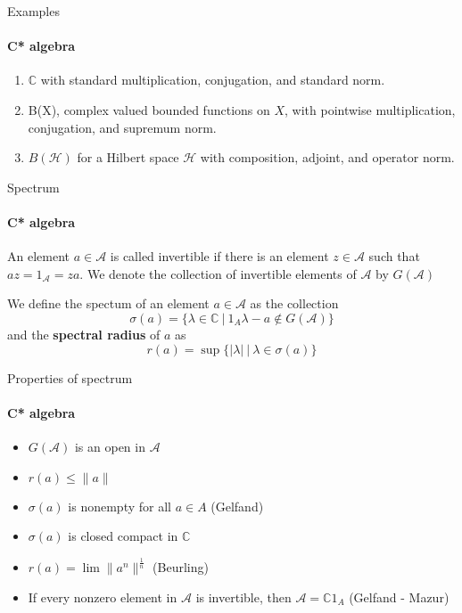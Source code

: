 \documentclass[dvipsnames]{beamer}
\newcommand{\1}{\mathds{1}}	%
\begin{document}
\begin{frame}{Examples}
\framesubtitle{C* algebra}
\begin{enumerate}
  \item $\mathbb{C}$ with standard multiplication, conjugation, and standard norm. \pause
  \item B(X), complex valued bounded functions on $X$, with pointwise multiplication, conjugation, and supremum norm.
  \item $B(\mathcal{H})$ for a Hilbert space $\mathcal{H}$ with composition, adjoint, and operator norm.
\end{enumerate}
\end{frame}

\begin{frame}{Spectrum}
\framesubtitle{C* algebra}
\begin{definition}
    An element $a \in \mathcal{A}$ is called invertible if there is an element $z \in \mathcal{A}$ such that $az = 1_\mathcal{A} = za$. \pause
    We denote the collection of invertible elements of $\mathcal{A}$ by $G(\mathcal{A})$
\end{definition} \pause

\begin{definition}
  We define the spectum of an element $a \in \mathcal{A}$ as the collection $$\sigma(a) = \{ \lambda \in \mathbb{C} \ |  \ 1_A \lambda - a \notin G(\mathcal{A})\}$$ \pause
  and the {\bf spectral radius} of $a$ as $$r(a) = \sup \{ |\lambda| \ | \ \lambda \in \sigma(a) \}$$
\end{definition}
\end{frame}

\begin{frame}{Properties of spectrum}
\framesubtitle{C* algebra}
\begin{itemize}
  \item $G(\mathcal{A})$ is an open in $\mathcal{A}$ \pause
  \item $r(a) \le \|a\|$ \pause
  \item $\sigma(a)$ is nonempty for all $a \in A$ (Gelfand) \pause
  \item $\sigma(a)$ is closed compact in $\mathbb{C}$ \pause
  \item $r(a) = \lim \|a^n\|^\frac{1}{n}$ (Beurling) \pause
  \item If every nonzero element in $\mathcal{A}$ is invertible, then $\mathcal{A} = \mathbb{C}1_A$ (Gelfand - Mazur)
\end{itemize}
\end{frame}
\end{document}
